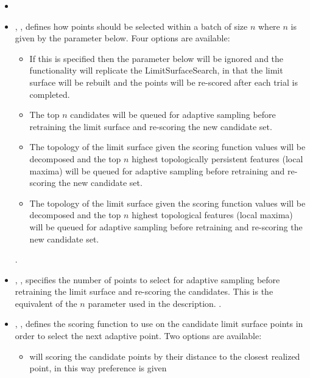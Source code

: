 \begin{itemize}
  \item \convergenceDescription
  \item {}, , defines how
    points should be selected within a batch of size $n$ where $n$ is given by
    the  parameter below.
    Four options are available:
    \begin{itemize}
       \item {} If this is specified then the
        parameter below will be ignored and the
       functionality will replicate the LimitSurfaceSearch, in that the limit
       surface will be rebuilt and the points will be re-scored after each trial
       is completed.
       \item {} The top $n$ candidates will be queued for
       adaptive sampling before retraining the limit surface and re-scoring the
       new candidate set.
       \item {} The topology of the limit surface given the
       scoring function values will be decomposed and the top $n$ highest
       topologically persistent features (local maxima) will be queued for
       adaptive sampling before retraining and re-scoring the new candidate set.
       \item {} The topology of the limit surface given the
       scoring function values will be decomposed and the top $n$ highest
       topological features (local maxima) will be queued for adaptive sampling
       before retraining and re-scoring the new candidate set.
    \end{itemize}
  .
  \item {}, , specifies
  the number of points to select for adaptive sampling before retraining the
  limit surface and re-scoring the candidates. This is the equivalent of the
  $n$ parameter used in the  description.
  .
  \item {}, , defines the scoring
    function to use on the candidate limit surface points in order to select the
    next adaptive point.
    Two options are available:
    \begin{itemize}
       \item {} will scoring the candidate points by their
       distance to the closest realized point, in this way preference is given

\end{itemize}
\end{itemize}
